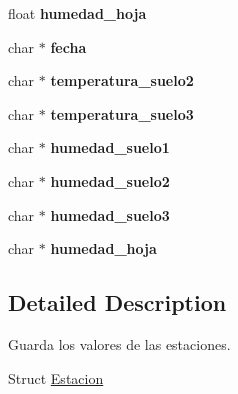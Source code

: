 \begin{DoxyCompactItemize}
\item 
float {\bfseries humedad\+\_\+hoja}\hypertarget{struct_estacion_a9fc4a4eba0726e4d744cd6572eb9c250}{}\label{struct_estacion_a9fc4a4eba0726e4d744cd6572eb9c250}

\item 
char $\ast$ {\bfseries fecha}\hypertarget{struct_estacion_acee7d3431770f50a41f2e2fcb61f0f49}{}\label{struct_estacion_acee7d3431770f50a41f2e2fcb61f0f49}

\item 
char $\ast$ {\bfseries temperatura\+\_\+suelo2}\hypertarget{struct_estacion_ab9f8ceaeee5a22e6f761252e7e005857}{}\label{struct_estacion_ab9f8ceaeee5a22e6f761252e7e005857}

\item 
char $\ast$ {\bfseries temperatura\+\_\+suelo3}\hypertarget{struct_estacion_af4ef559d910e2765cf5031311c927561}{}\label{struct_estacion_af4ef559d910e2765cf5031311c927561}

\item 
char $\ast$ {\bfseries humedad\+\_\+suelo1}\hypertarget{struct_estacion_a868f097203ae79f33254ad0bc4140d6a}{}\label{struct_estacion_a868f097203ae79f33254ad0bc4140d6a}

\item 
char $\ast$ {\bfseries humedad\+\_\+suelo2}\hypertarget{struct_estacion_a4bf4afd6e3c929ac436989c8eb45e9f4}{}\label{struct_estacion_a4bf4afd6e3c929ac436989c8eb45e9f4}

\item 
char $\ast$ {\bfseries humedad\+\_\+suelo3}\hypertarget{struct_estacion_af545835c76515c2a61f0044a49ca225e}{}\label{struct_estacion_af545835c76515c2a61f0044a49ca225e}

\item 
char $\ast$ {\bfseries humedad\+\_\+hoja}\hypertarget{struct_estacion_abfe82b58466e207850df83da971619b1}{}\label{struct_estacion_abfe82b58466e207850df83da971619b1}

\end{DoxyCompactItemize}


\subsection{Detailed Description}
Guarda los valores de las estaciones. 

Struct \hyperlink{struct_estacion}{Estacion}


